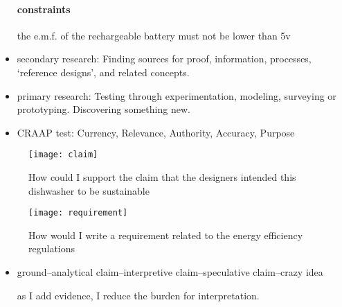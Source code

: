 \documentclass[12pt]{article}
\begin{document}
\begin{itemize}
\paragraph{constraints}

the e.m.f. of the rechargeable battery must not be lower than 5v

\item secondary research: Finding sources for proof, information, processes, ‘reference designs’, and related concepts.

\item primary research:  Testing through experimentation, modeling, surveying or prototyping. Discovering something new.

\item CRAAP test: Currency, Relevance, Authority, Accuracy, Purpose 


\end{itemize}

\begin{figure}[h!]
\begin{center}
\texttt{[image: claim]}
\caption{How could I support the claim that the designers intended this dishwasher to be sustainable}
\end{center}
\end{figure}

\begin{figure}[h!]
\begin{center}
\texttt{[image: requirement]}
\caption{How would I write a requirement related to the energy efficiency regulations}
\end{center}
\end{figure}

\begin{itemize}

\item  ground--analytical claim--interpretive claim--speculative claim--crazy idea

as I add evidence, I reduce the burden for interpretation.

\end{itemize}
\end{document}
